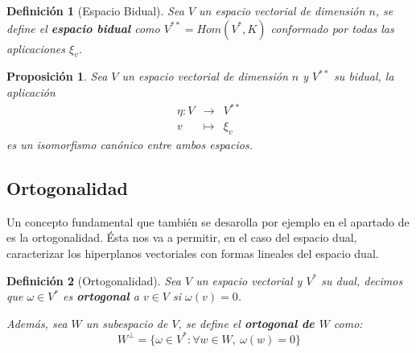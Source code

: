 \documentclass[10pt,a4paper,openright]{book}
\theoremstyle{break}
\newtheorem*{defi}{Definición}
\newtheorem*{prop}{Proposición}
\begin{document}
\begin{defi}[Espacio Bidual]
Sea $V$ un espacio vectorial de dimensión $n$, se define el \textbf{espacio bidual} como $V^{**} = Hom(V^*, K)$ conformado por todas las aplicaciones $\xi_v$.
\end{defi}

\begin{prop}
Sea $V$ un espacio vectorial de dimensión $n$ y $V^{**}$ su bidual, la aplicación
\begin{eqnarray*}
\eta: V &\longrightarrow& V^{**} \\ v &\longmapsto& \xi_v
\end{eqnarray*}
es un isomorfismo canónico entre ambos espacios.
\end{prop}

\subsection{Ortogonalidad}
\label{Ortogonalidad dual}
Un concepto fundamental que también se desarolla por ejemplo en el apartado de  es la ortogonalidad. Ésta nos va a permitir, en el caso del espacio dual, caracterizar los hiperplanos vectoriales con formas lineales del espacio dual.

\begin{defi}[Ortogonalidad]
Sea $V$ un espacio vectorial y $V^*$ su dual, decimos que $\omega \in V^*$ es \textbf{ortogonal} a $v\in V$ si $\omega(v)=0$.

Además, sea $W$ un subespacio de $V$, se define el \textbf{ortogonal de $W$} como:
$$W^\perp=\{\omega \in V^*:\forall w \in W, \ \omega(w)=0\}$$
\end{defi}
\end{document}
